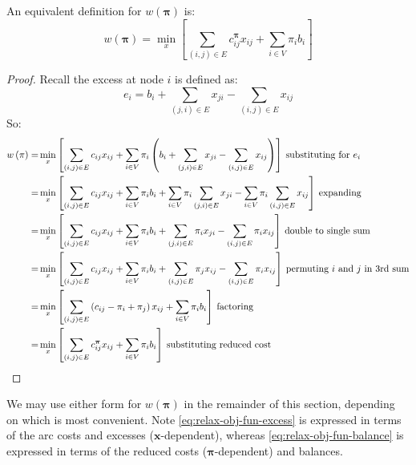 \begin{lemma}
An equivalent definition for $w(\boldsymbol{\pi})$ is:
\begin{equation} \label{eq:relax-obj-fun-balance}
w(\boldsymbol{\pi})=\min_{x}\left[\sum_{\left(i,j\right)\in E}c_{ij}^{\boldsymbol{\pi}}x_{ij}+\sum_{i\in V}\pi_{i}b_{i}\right]
\end{equation}
\end{lemma}
\begin{proof}
Recall the excess at node $i$ is defined as:
\[e_{i}=b_{i}+\sum_{(j,i)\in E}x_{ji}-\sum_{(i,j)\in E}x_{ij}\]
So:
\begin{align*}
w\left(\pi\right)= & \min_{x}\left[\sum_{\left(i,j\right)\in E}c_{ij}x_{ij}+\sum_{i\in V}\pi_{i}\left(b_{i}+\sum_{(j,i)\in E}x_{ji}-\sum_{(i,j)\in E}x_{ij}\right)\right]\:\mbox{substituting for }e_{i}\\
= & \min_{x}\left[\sum_{\left(i,j\right)\in E}c_{ij}x_{ij}+\sum_{i\in V}\pi_{i}b_{i}+\sum_{i\in V}\pi_{i}\sum_{(j,i)\in E}x_{ji}-\sum_{i\in V}\pi_{i}\sum_{(i,j)\in E}x_{ij}\right]\:\mbox{expanding}\\
= & \min_{x}\left[\sum_{\left(i,j\right)\in E}c_{ij}x_{ij}+\sum_{i\in V}\pi_{i}b_{i}+\sum_{(j,i)\in E}\pi_{i}x_{ji}-\sum_{(i,j)\in E}\pi_{i}x_{ij}\right]\:\mbox{double to single sum}\\
= & \min_{x}\left[\sum_{\left(i,j\right)\in E}c_{ij}x_{ij}+\sum_{i\in V}\pi_{i}b_{i}+\sum_{(i,j)\in E}\pi_{j}x_{ij}-\sum_{(i,j)\in E}\pi_{i}x_{ij}\right]\:\mbox{permuting \ensuremath{i} and \ensuremath{j} in 3rd sum}\\
= & \min_{x}\left[\sum_{\left(i,j\right)\in E}\left(c_{ij}-\pi_{i}+\pi_{j}\right)x_{ij}+\sum_{i\in V}\pi_{i}b_{i}\right]\:\mbox{factoring}\\
= & \min_{x}\left[\sum_{\left(i,j\right)\in E}c_{ij}^{\boldsymbol{\pi}}x_{ij}+\sum_{i\in V}\pi_{i}b_{i}\right]\:\mbox{substituting reduced cost}
\end{align*}
\end{proof}

We may use either form for $w(\boldsymbol{\pi})$ in the remainder of this section, depending on which is most convenient. Note \cref{eq:relax-obj-fun-excess} is expressed in terms of the arc costs and excesses ($\mathbf{x}$-dependent), whereas \cref{eq:relax-obj-fun-balance} is expressed in terms of the reduced costs ($\boldsymbol{\pi}$-dependent) and balances.\\

